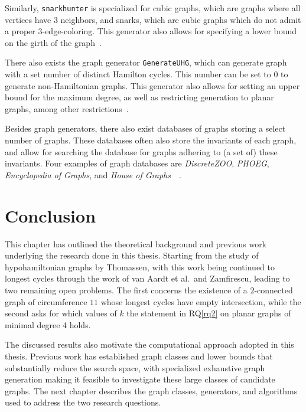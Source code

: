Similarly, \texttt{snarkhunter} is specialized for cubic graphs, which are graphs where all vertices have 3 neighbors, and snarks, which are cubic graphs which do not admit a proper $3$-edge-coloring. This generator also allows for specifying a lower bound on the girth of the graph~\cite{article:jorik-jooken}.

There also exists the graph generator \texttt{GenerateUHG}, which can generate graph with a set number of distinct Hamilton cycles. This number can be set to 0 to generate non-Hamiltonian graphs. This generator also allows for setting an upper bound for the maximum degree, as well as restricting generation to planar graphs, among other restrictions~\cite{lib:UHG}.

Besides graph generators, there also exist databases of graphs storing a select number of graphs. These databases often also store the invariants of each graph, and allow for searching the database for graphs adhering to (a set of) these invariants. Four examples of graph databases are \textit{DiscreteZOO}, \textit{PHOEG}, \textit{Encyclopedia of Graphs}, and \textit{House of Graphs}~\cite{data:houseofgraphs}~\cite{article:jorik-jooken}.

\section{Conclusion}

This chapter has outlined the theoretical background and previous work underlying the research done in this thesis. Starting from the study of hypohamiltonian graphs by Thomassen, with this work being continued to longest cycles through the work of van Aardt et al.\ and Zamfirescu, leading to two remaining open problems. The first concerns the existence of a $2$-connected graph of circumference $11$ whose longest cycles have empty intersection, while the second asks for which values of $k$ the statement in RQ\ref{rq2} on planar graphs of minimal degree 4 holds.

The discussed results also motivate the computational approach adopted in this thesis. Previous work has established graph classes and lower bounds that substantially reduce the search space, with specialized exhaustive graph generation making it feasible to investigate these large classes of candidate graphs. The next chapter describes the graph classes, generators, and algorithms used to address the two research questions.
